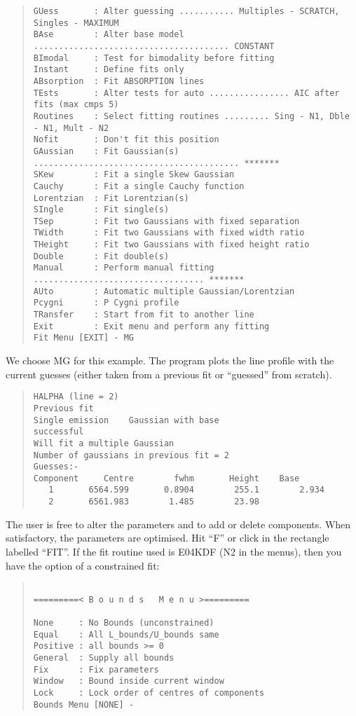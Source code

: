 \begin{quote}
\begin{verbatim}
GUess       : Alter guessing ........... Multiples - SCRATCH, Singles - MAXIMUM
BAse        : Alter base model ....................................... CONSTANT
BImodal     : Test for bimodality before fitting
Instant     : Define fits only
ABsorption  : Fit ABSORPTION lines
TEsts       : Alter tests for auto ................ AIC after fits (max cmps 5)
Routines    : Select fitting routines ......... Sing - N1, Dble - N1, Mult - N2
Nofit       : Don't fit this position
GAussian    : Fit Gaussian(s) ......................................... *******
SKew        : Fit a single Skew Gaussian
Cauchy      : Fit a single Cauchy function
Lorentzian  : Fit Lorentzian(s)
SIngle      : Fit single(s)
TSep        : Fit two Gaussians with fixed separation
TWidth      : Fit two Gaussians with fixed width ratio
THeight     : Fit two Gaussians with fixed height ratio
Double      : Fit double(s)
Manual      : Perform manual fitting .................................. *******
AUto        : Automatic multiple Gaussian/Lorentzian
Pcygni      : P Cygni profile
TRansfer    : Start from fit to another line
Exit        : Exit menu and perform any fitting
Fit Menu [EXIT] - MG
\end{verbatim}\end{quote}
We choose MG for this example. The program plots the line profile with
the current guesses (either taken from a previous fit or ``guessed''
from scratch).
\begin{quote}\begin{verbatim}
HALPHA (line = 2)
Previous fit
Single emission    Gaussian with base
successful
Will fit a multiple Gaussian
Number of gaussians in previous fit = 2
Guesses:-
Component     Centre        fwhm       Height    Base
   1       6564.599       0.8904        255.1        2.934
   2       6561.983        1.485        23.98
\end{verbatim}\end{quote}
The user is free to alter the parameters and to add or delete
components. When satisfactory, the parameters are optimised. Hit ``F''
or click in the rectangle labelled ``FIT''. If the fit routine used is
E04KDF (N2 in the menus), then you have the option of a constrained fit:
\begin{quote}\begin{verbatim}

=========< B o u n d s   M e n u >=========
 
None     : No Bounds (unconstrained)
Equal    : All L_bounds/U_bounds same
Positive : all bounds >= 0
General  : Supply all bounds
Fix      : Fix parameters
Window   : Bound inside current window
Lock     : Lock order of centres of components
Bounds Menu [NONE] -
\end{verbatim}\end{quote}
